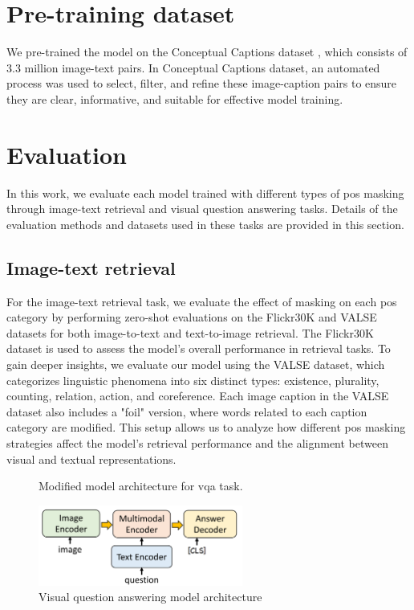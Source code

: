 \section{Pre-training dataset}
We pre-trained the model on the Conceptual Captions dataset \cite{conceptual-caption}, which consists of 3.3 million image-text pairs. 
In Conceptual Captions dataset, an automated process was used to select, filter, and refine these image-caption pairs to ensure they are clear, informative, and suitable for effective model training.

\section{Evaluation}
In this work, we evaluate each model trained with different types of \acrshort{pos} masking through image-text retrieval and visual question answering tasks. 
Details of the evaluation methods and datasets used in these tasks are provided in this section.

\subsection{Image-text retrieval}
For the image-text retrieval task, we evaluate the effect of masking on each \acrshort{pos} category by performing zero-shot evaluations on the Flickr30K \cite{flickr30k} and VALSE \cite{valse} datasets for both image-to-text and text-to-image retrieval. 
The Flickr30K dataset is used to assess the model's overall performance in retrieval tasks. 
To gain deeper insights, we evaluate our model using the VALSE dataset, which categorizes linguistic phenomena into six distinct types: existence, plurality, counting, relation, action, and coreference.
Each image caption in the VALSE dataset also includes a "foil" version, where words related to each caption category are modified. 
This setup allows us to analyze how different \acrshort{pos} masking strategies affect the model's retrieval performance and the alignment between visual and textual representations.

\begin{figure}[h]
    \caption{Visual question answering model architecture}
    \label{fig:vqa}
    Modified model architecture for \acrshort{vqa} task.
    \begin{center}
        \includegraphics[width=0.6\textwidth]{Images/vqa_method.png}
    \end{center}
    \small
\end{figure}

